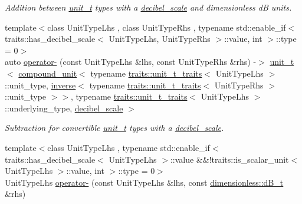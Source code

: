 \begin{DoxyCompactItemize}
\begin{DoxyCompactList}\small\item\em Addition between \hyperlink{classunits_1_1unit__t}{unit\+\_\+t} types with a \hyperlink{structunits_1_1decibel__scale}{decibel\+\_\+scale} and dimensionless d\+B units. \end{DoxyCompactList}\item 
\hypertarget{namespaceunits_aa3bd152cb3657ecbd02f3d21d6599d62}{}{\footnotesize template$<$class Unit\+Type\+Lhs , class Unit\+Type\+Rhs , typename std\+::enable\+\_\+if$<$ traits\+::has\+\_\+decibel\+\_\+scale$<$ Unit\+Type\+Lhs, Unit\+Type\+Rhs $>$\+::value, int $>$\+::type  = 0$>$ }\\auto \hyperlink{namespaceunits_aa3bd152cb3657ecbd02f3d21d6599d62}{operator-\/} (const Unit\+Type\+Lhs \&lhs, const Unit\+Type\+Rhs \&rhs) -\/$>$ \hyperlink{classunits_1_1unit__t}{unit\+\_\+t}$<$ \hyperlink{group___unit_types_ga9c3f6f077dc894620e1ed8358442a8f1}{compound\+\_\+unit}$<$ typename \hyperlink{structunits_1_1traits_1_1unit__t__traits}{traits\+::unit\+\_\+t\+\_\+traits}$<$ Unit\+Type\+Lhs $>$\+::unit\+\_\+type, \hyperlink{group___unit_manipulators_gaacc539ef162e24b260d023d3ff949b57}{inverse}$<$ typename \hyperlink{structunits_1_1traits_1_1unit__t__traits}{traits\+::unit\+\_\+t\+\_\+traits}$<$ Unit\+Type\+Rhs $>$\+::unit\+\_\+type $>$$>$, typename \hyperlink{structunits_1_1traits_1_1unit__t__traits}{traits\+::unit\+\_\+t\+\_\+traits}$<$ Unit\+Type\+Lhs $>$\+::underlying\+\_\+type, \hyperlink{structunits_1_1decibel__scale}{decibel\+\_\+scale} $>$\label{namespaceunits_aa3bd152cb3657ecbd02f3d21d6599d62}

\begin{DoxyCompactList}\small\item\em Subtraction for convertible \hyperlink{classunits_1_1unit__t}{unit\+\_\+t} types with a \hyperlink{structunits_1_1decibel__scale}{decibel\+\_\+scale}. \end{DoxyCompactList}\item 
\hypertarget{namespaceunits_a38f54d23ecf931ee73d810e1bbace48b}{}{\footnotesize template$<$class Unit\+Type\+Lhs , typename std\+::enable\+\_\+if$<$ traits\+::has\+\_\+decibel\+\_\+scale$<$ Unit\+Type\+Lhs $>$\+::value \&\&!traits\+::is\+\_\+scalar\+\_\+unit$<$ Unit\+Type\+Lhs $>$\+::value, int $>$\+::type  = 0$>$ }\\Unit\+Type\+Lhs \hyperlink{namespaceunits_a38f54d23ecf931ee73d810e1bbace48b}{operator-\/} (const Unit\+Type\+Lhs \&lhs, const \hyperlink{classunits_1_1unit__t}{dimensionless\+::d\+B\+\_\+t} \&rhs)\label{namespaceunits_a38f54d23ecf931ee73d810e1bbace48b}


\end{DoxyCompactItemize}
